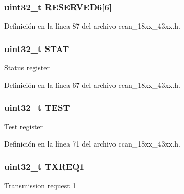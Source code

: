 \subsubsection[{\texorpdfstring{R\+E\+S\+E\+R\+V\+E\+D6}{RESERVED6}}]{ uint32\+\_\+t R\+E\+S\+E\+R\+V\+E\+D6\mbox{[}6\mbox{]}}\hypertarget{struct_l_p_c___c_c_a_n___t_a656b237e614b6d241574604849d86b8b}{}\label{struct_l_p_c___c_c_a_n___t_a656b237e614b6d241574604849d86b8b}


Definición en la línea 87 del archivo ccan\+\_\+18xx\+\_\+43xx.\+h.

\subsubsection[{\texorpdfstring{S\+T\+AT}{STAT}}]{ uint32\+\_\+t S\+T\+AT}\hypertarget{struct_l_p_c___c_c_a_n___t_aa90c98b3b95ed1374dbcf018c74aef79}{}\label{struct_l_p_c___c_c_a_n___t_aa90c98b3b95ed1374dbcf018c74aef79}
Status register 

Definición en la línea 67 del archivo ccan\+\_\+18xx\+\_\+43xx.\+h.

\subsubsection[{\texorpdfstring{T\+E\+ST}{TEST}}]{ uint32\+\_\+t T\+E\+ST}\hypertarget{struct_l_p_c___c_c_a_n___t_a071509075a20265b5c09b13d91247a9c}{}\label{struct_l_p_c___c_c_a_n___t_a071509075a20265b5c09b13d91247a9c}
Test register 

Definición en la línea 71 del archivo ccan\+\_\+18xx\+\_\+43xx.\+h.

\subsubsection[{\texorpdfstring{T\+X\+R\+E\+Q1}{TXREQ1}}]{ uint32\+\_\+t T\+X\+R\+E\+Q1}\hypertarget{struct_l_p_c___c_c_a_n___t_a3dc7ce173845d25334a5f36b4206951a}{}\label{struct_l_p_c___c_c_a_n___t_a3dc7ce173845d25334a5f36b4206951a}
Transmission request 1 

